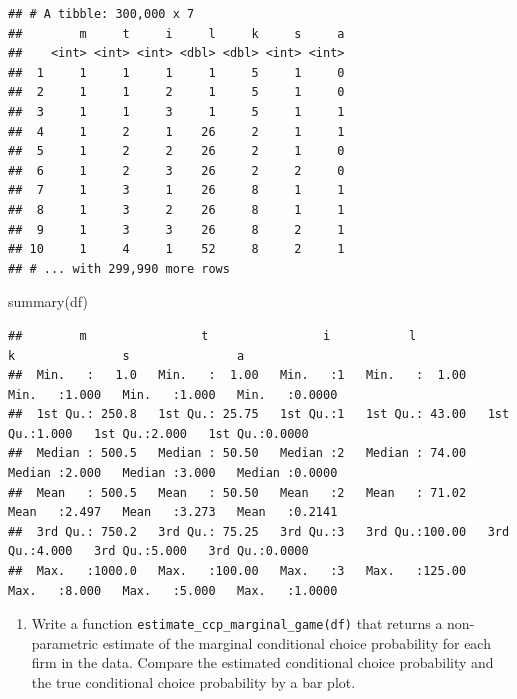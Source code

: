 \documentclass[
]{book}
\newenvironment{Shaded}{\begin{snugshade}}{\end{snugshade}}
\newcommand{\FunctionTok}[1]{\textcolor[rgb]{0.00,0.00,0.00}{#1}}
\newcommand{\NormalTok}[1]{#1}
\providecommand{\tightlist}{%
  \setlength{\itemsep}{0pt}\setlength{\parskip}{0pt}}
\begin{document}
\begin{verbatim}
## # A tibble: 300,000 x 7
##        m     t     i     l     k     s     a
##    <int> <int> <int> <dbl> <dbl> <int> <int>
##  1     1     1     1     1     5     1     0
##  2     1     1     2     1     5     1     0
##  3     1     1     3     1     5     1     1
##  4     1     2     1    26     2     1     1
##  5     1     2     2    26     2     1     0
##  6     1     2     3    26     2     2     0
##  7     1     3     1    26     8     1     1
##  8     1     3     2    26     8     1     1
##  9     1     3     3    26     8     2     1
## 10     1     4     1    52     8     2     1
## # ... with 299,990 more rows
\end{verbatim}

\begin{Shaded}
\begin{Highlighting}[]
\FunctionTok{summary}\NormalTok{(df)}
\end{Highlighting}
\end{Shaded}

\begin{verbatim}
##        m                t                i           l                k               s               a         
##  Min.   :   1.0   Min.   :  1.00   Min.   :1   Min.   :  1.00   Min.   :1.000   Min.   :1.000   Min.   :0.0000  
##  1st Qu.: 250.8   1st Qu.: 25.75   1st Qu.:1   1st Qu.: 43.00   1st Qu.:1.000   1st Qu.:2.000   1st Qu.:0.0000  
##  Median : 500.5   Median : 50.50   Median :2   Median : 74.00   Median :2.000   Median :3.000   Median :0.0000  
##  Mean   : 500.5   Mean   : 50.50   Mean   :2   Mean   : 71.02   Mean   :2.497   Mean   :3.273   Mean   :0.2141  
##  3rd Qu.: 750.2   3rd Qu.: 75.25   3rd Qu.:3   3rd Qu.:100.00   3rd Qu.:4.000   3rd Qu.:5.000   3rd Qu.:0.0000  
##  Max.   :1000.0   Max.   :100.00   Max.   :3   Max.   :125.00   Max.   :8.000   Max.   :5.000   Max.   :1.0000
\end{verbatim}

\begin{enumerate}
\def\labelenumi{\arabic{enumi}.}
\setcounter{enumi}{13}
\tightlist
\item
  Write a function \texttt{estimate\_ccp\_marginal\_game(df)} that returns a non-parametric estimate of the marginal conditional choice probability for each firm in the data. Compare the estimated conditional choice probability and the true conditional choice probability by a bar plot.
\end{enumerate}
\end{document}
